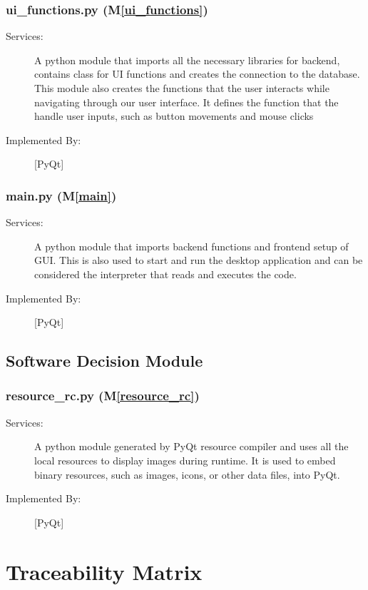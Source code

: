 \documentclass[12pt, titlepage]{article}
\newcommand{\mref}[1]{M\ref{#1}}
\begin{document}
\subsubsection{ui\_functions.py (\mref{ui_functions})}
\begin{description}
\item[Services:] A python module that imports all the necessary libraries for backend, contains class for UI functions and creates the connection to the database. This module also creates the functions that the user interacts while navigating through our user interface. It defines the function that the handle user inputs, such as button movements and mouse clicks
\item[Implemented By:] [PyQt]
\end{description}

\subsubsection{main.py (\mref{main})}
\begin{description}
\item[Services:] A python module that imports backend functions and frontend setup of GUI. This is also used to start and run the desktop application and can be considered the interpreter that reads and executes the code.
\item[Implemented By:] [PyQt]
\end{description}

\subsection{Software Decision Module}

\subsubsection{resource\_rc.py (\mref{resource_rc})}

\begin{description}

  \item[Services:] A python module generated by PyQt resource compiler and uses all the local resources to display images during runtime. It is used to embed binary resources, such as images, icons, or other data files, into PyQt.
  \item[Implemented By:] [PyQt] 
  \end{description}

\newpage
\section{Traceability Matrix} \label{SecTM}
\end{document}
